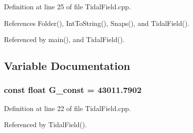 Definition at line 25 of file TidalField.cpp.



References Folder(), IntToString(), Snaps(), and TidalField().



Referenced by main(), and TidalField().



\subsection{Variable Documentation}
\subsubsection[{G\_\-const}]{\setlength{\rightskip}{0pt plus 5cm}const float {\bf G\_\-const} = 43011.7902}\label{TidalField_8cpp_a7b345eb0c3df6f6ba79154edea08afa6}


Definition at line 22 of file TidalField.cpp.



Referenced by TidalField().

